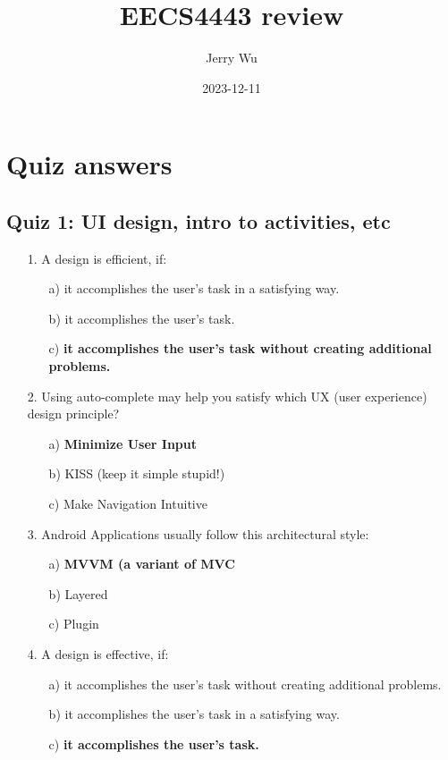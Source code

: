 \documentclass[12pt]{book}
\title{EECS4443 review}
\author{Jerry Wu}
\date{2023-12-11}
\begin{document}
\maketitle
\tableofcontents

\chapter{Quiz answers}

\section*{Quiz 1: UI design, intro to activities, etc}

\begin{itemize}
    \item[1.] A design is efficient, if:
    \begin{itemize}
        \item[a)] it accomplishes the user's task in a satisfying way.
        \item[b)] it accomplishes the user's task.
        \item[c)] \textbf{it accomplishes the user's task without creating additional problems.}

    \end{itemize}
    \item[2.] Using auto-complete may help you satisfy which UX (user experience) design principle?
    \begin{itemize}
        \item[a)] \textbf{Minimize User Input}
        \item[b)] KISS (keep it simple stupid!)
        \item[c)] Make Navigation Intuitive
    \end{itemize}
    
    \item[3.] Android Applications usually follow this architectural style:
    \begin{itemize}
        \item[a)] \textbf{MVVM (a variant of MVC}
        \item[b)] Layered
        \item[c)] Plugin
    \end{itemize}
    
    \item[4.] A design is effective, if:
    \begin{itemize}
        \item[a)] it accomplishes the user's task without creating additional problems.
        \item[b)] it accomplishes the user's task in a satisfying way.
        \item[c)] \textbf{it accomplishes the user's task.}
    \end{itemize}
    

\end{itemize}
\end{document}
